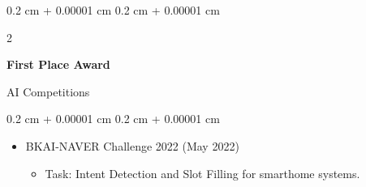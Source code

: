 \documentclass[10pt, letterpaper]{article}
\newenvironment{highlights}{
    \begin{itemize}[
        topsep=0.10 cm,
        parsep=0.10 cm,
        partopsep=0pt,
        itemsep=0pt,
        leftmargin=0.4 cm + 10pt
    ]
}{
    \end{itemize}
} %
\newenvironment{onecolentry}{
    \begin{adjustwidth}{
        0.2 cm + 0.00001 cm
    }{
        0.2 cm + 0.00001 cm
    }
}{
    \end{adjustwidth}
} %
\newenvironment{twocolentry}[2][]{
    \onecolentry
    \def\secondColumn{#2}
    \setcolumnwidth{\fill, 4.5 cm}
    \begin{paracol}{2}
}{
    \switchcolumn \raggedleft \secondColumn
    \end{paracol}
    \endonecolentry
} %
\begin{document}
        \vspace{0.2 cm}

        \begin{twocolentry}{AI Competitions}
            \textbf{First Place Award}
        \end{twocolentry}

        \begin{onecolentry}
            \begin{highlights}
                \item BKAI-NAVER Challenge 2022 (May 2022)
                \begin{itemize}
                    \item Task: Intent Detection and Slot Filling for smarthome systems.
                \end{itemize}
            \end{highlights}
        \end{onecolentry}
\end{document}

